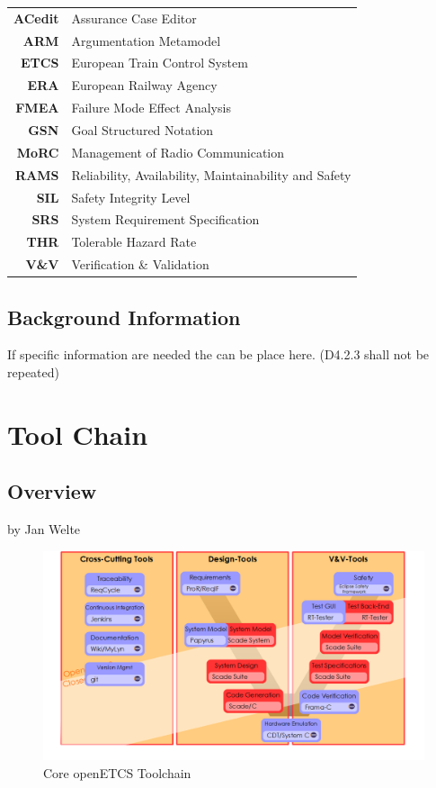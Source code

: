 \documentclass{template/openetcs_report}
\begin{document}
\begin{tabular}{rl}
\textbf{ACedit} & Assurance Case Editor \\ 
\textbf{ARM} & Argumentation  Metamodel \\ 
\textbf{ETCS} & European Train Control System \\ \textbf{ERA} & European Railway Agency \\ \textbf{FMEA} & Failure Mode Effect Analysis \\ 
\textbf{GSN} & Goal Structured Notation \\ 
\textbf{MoRC} & Management of Radio Communication \\ 
\textbf{RAMS} & Reliability, Availability, Maintainability and Safety \\
\textbf{SIL} & Safety Integrity Level \\ 
\textbf{SRS} & System Requirement Specification \\ 
\textbf{THR} & Tolerable Hazard Rate \\ 
\textbf{V\&V} & Verification \& Validation \\ 
\end{tabular} 




\section{Background Information}
\label{sec:Background}


If specific information are needed the can be place here. (D4.2.3 shall not be repeated)


\chapter{Tool Chain}

\section{Overview}

by Jan Welte

\begin{figure}[h]
\centering
\includegraphics[width=0.9\linewidth]{./images/Toolchain-New-Version-V-Model-Nov-2015}
\caption{Core openETCS Toolchain}
\label{fig:Toolchain-New}
\end{figure}
\end{document}
